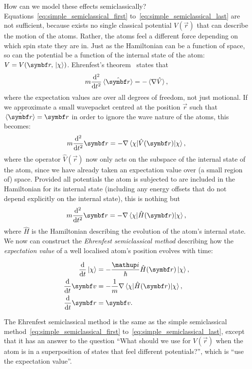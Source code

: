 How can we model these effects semiclassically? Equations~\eqref{eq:simple_semiclassical_first} to~\eqref{eq:simple_semiclassical_last} are not sufficient, because exists no single classical potential $V(\vec r)$ that can describe the motion of the atoms. Rather, the atoms feel a different force depending on which spin state they are in. Just as the Hamiltonian can be a function of space, so can the potential be a function of the internal state of the atom: $V = V(\vec{r}, \ket\chi)$. Ehrenfest's theorem~\cite{Ehrenfest1927} states that
\begin{align}
m\dv[2]{t}\ev{\hat{\vec r}} = - \ev{\nabla \hat V},
\end{align}
where the expectation values are over all degrees of freedom, not just motional. If we approximate a small wavepacket centred at the position $\vec r$ such that $\ev{\hat{\vec r}} = \vec r$ in order to ignore the wave nature of the atoms, this becomes:
\begin{align}
m\dv[2]{t} \vec r = - \nabla \matrixel{\chi}{\hat V(\vec r)}{\chi},
\end{align}
where the operator $\hat V(\vec r)$ now only acts on the subspace of the internal state of the atom, since we have already taken an expectation value over (a small region of) space. Provided all potentials the atom is subjected to are included in the Hamiltonian for its internal state (including any energy offsets that do not
depend explicitly on the internal state), this is nothing but
\begin{align}
m\dv[2]{t} \vec r = - \nabla \matrixel{\chi}{\hat H(\vec r)}{\chi},
\end{align}
where $\hat H$ is the Hamiltonian describing the evolution of the atom's internal state. We now can construct the \emph{Ehrenfest semiclassical method} describing how the \emph{expectation value} of a well localised atom's position evolves with time:

\begin{align}\label{eq:ehrenfest_semiclassical_first}
\dv{t}\ket\chi &= -\frac\ii\hbar \hat H(\vec r)\ket\chi,\\
\dv{t}\vec v &= -\frac1m \nabla \matrixel{\chi}{\hat H(\vec r)}{\chi},\\
\dv{t}\vec r &= \vec v\label{eq:ehrenfest_semiclassical_last}.
\end{align}

The Ehrenfest semiclassical method is the same as the simple semiclassical method~\eqref{eq:simple_semiclassical_first} to~\eqref{eq:simple_semiclassical_last}, except that it has an answer to the question ``What should we use for $V(\vec r)$ when the atom is in a superposition of states that feel different potentials?'', which is ``use the expectation value''. 

